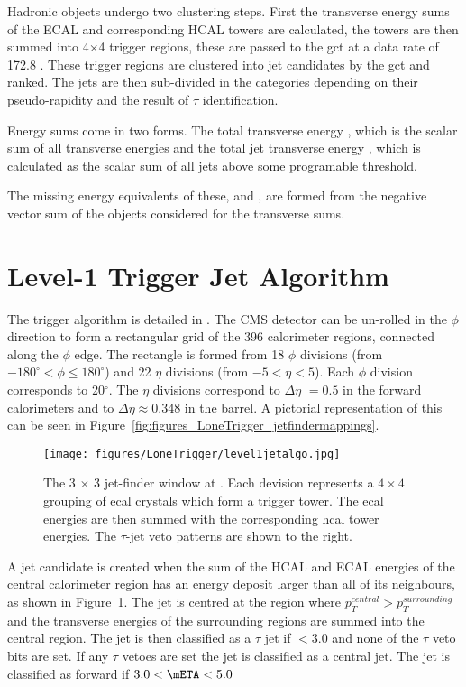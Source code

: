 Hadronic objects undergo two clustering steps. First the transverse energy 
sums of the ECAL and corresponding HCAL towers are calculated, the towers are 
then summed into 4$\times$4 trigger regions, these  are passed to the \ac{gct} at a 
data rate of 172.8 \Gbs. These trigger regions are clustered into jet 
candidates by the \ac{gct} and ranked. The jets are then sub-divided in the 
categories depending on their pseudo-rapidity and the result of $\tau$ 
identification. 

Energy sums come in two forms. The total transverse energy \ET, which is the 
scalar sum of all transverse energies and the total jet transverse energy \HT,
which is calculated as the scalar sum of all jets above some programable 
threshold.

The missing energy equivalents of these, \MET and \MHT, are formed from the 
negative vector sum of the objects considered for the transverse sums.



\section{Level-1 Trigger Jet Algorithm} %
\label{sec:leve_1_trigger_jet_algorithm}
The \Lone trigger algorithm is detailed in \cite{gctcomm}.
The CMS detector can be un-rolled in the $\phi$ direction to form a rectangular 
grid of the 396 calorimeter regions, connected along the $\phi$ edge. The
rectangle is formed from 18 $\phi$ divisions (from $-180^{\circ} < \phi \leq 
180^{\circ}$) and 22 $\eta$ divisions (from $-5 < \eta < 5$). Each $\phi$ 
division corresponds to 20$^{\circ}$. The $\eta$ divisions correspond to 
$\Delta\eta$ $= 0.5$ in the forward calorimeters and to $\Delta\eta \approx 
0.348$ in the barrel. A pictorial representation of this can be seen in 
Figure~\ref{fig:figures_LoneTrigger_jetfindermappings}.

\begin{figure}[ht]
  \centering
    \texttt{[image: figures/LoneTrigger/level1jetalgo.jpg]}
  \caption{The 3 $\times$ 3 jet-finder window at \Lone. Each devision represents a $4\times4$ grouping of \ac{ecal} crystals which form a trigger tower. The \ac{ecal} energies are then summed with the corresponding \ac{hcal} tower energies. The $\tau$-jet veto patterns are shown to the right.}
  \label{fig:figures_LoneTrigger_level1jetalgo}
\end{figure}


A jet candidate is created when the sum of the HCAL and ECAL energies of the 
central calorimeter region has an energy deposit larger than all of its 
neighbours, as shown in Figure~\ref{fig:figures_LoneTrigger_level1jetalgo}.
The jet is centred at the region where $p_{T}^{central} > p_{T}^{surrounding}$
and the transverse energies of the surrounding regions are summed into the 
central region. The jet is then classified as a $\tau$ jet if \mETA $< 3.0$ and 
none of the $\tau$ veto bits are set. If any $\tau$ vetoes are set the jet is 
classified as a central jet. The jet is classified as forward if $ 3.0 < \mETA 
< 5.0$


